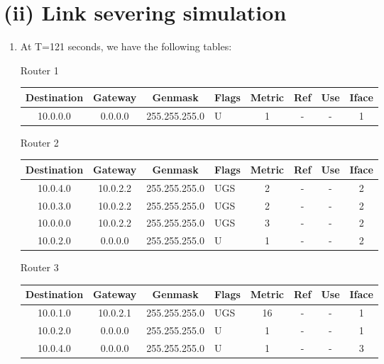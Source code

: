 \documentclass[12pt]{article}
\begin{document}
\section*{(ii) Link severing simulation}
\begin{enumerate}[label=(\alph*)]
    \item At T=121 seconds, we have the following tables:
    \begin{center}
        Router 1

        \begin{tabular}{|c|c|c|l|c|c|c|c|}
          \hline
          Destination & Gateway & Genmask & Flags & Metric & Ref & Use & Iface \\
          \hline
          10.0.0.0 & 0.0.0.0 & 255.255.255.0 & U & 1 & - & - & 1 \\
          \hline
        \end{tabular}

        Router 2

        \begin{tabular}{|c|c|c|l|c|c|c|c|}
          \hline
          Destination & Gateway & Genmask & Flags & Metric & Ref & Use & Iface \\
          \hline
          10.0.4.0 & 10.0.2.2 & 255.255.255.0 & UGS & 2 & - & - & 2 \\
          10.0.3.0 & 10.0.2.2 & 255.255.255.0 & UGS & 2 & - & - & 2 \\
          10.0.0.0 & 10.0.2.2 & 255.255.255.0 & UGS & 3 & - & - & 2 \\
          10.0.2.0 & 0.0.0.0 & 255.255.255.0 & U & 1 & - & - & 2 \\
          \hline
        \end{tabular}

        Router 3

        \begin{tabular}{|c|c|c|l|c|c|c|c|}
          \hline
          Destination & Gateway & Genmask & Flags & Metric & Ref & Use & Iface \\
          \hline
          10.0.1.0 & 10.0.2.1 & 255.255.255.0 & UGS & 16 & - & - & 1 \\
          10.0.2.0 & 0.0.0.0 & 255.255.255.0 & U & 1 & - & - & 1 \\
          10.0.4.0 & 0.0.0.0 & 255.255.255.0 & U & 1 & - & - & 3 \\
          \hline
        \end{tabular}
    \end{center}


\end{enumerate}
\end{document}
